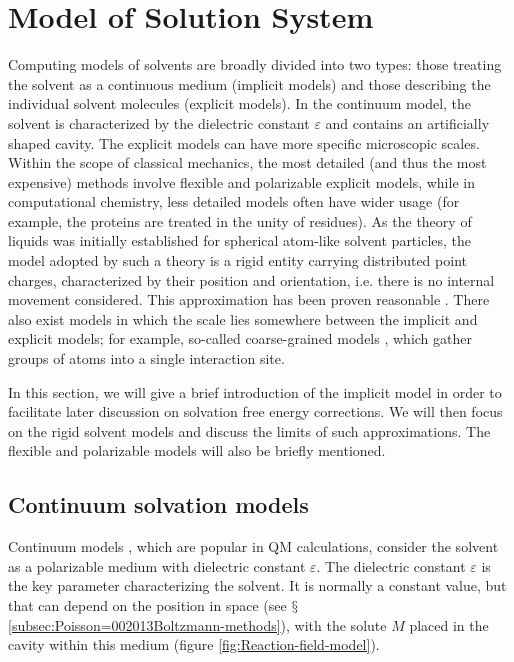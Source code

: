 
\chapter{Model of Solution System\label{chpt:models}}

Computing models of solvents are broadly divided into two types: those
treating the solvent as a continuous medium (implicit models) and
those describing the individual solvent molecules (explicit models).
In the continuum model, the solvent is characterized by the dielectric
constant $\varepsilon$ and contains an artificially shaped cavity.
The explicit models can have more specific microscopic scales. Within
the scope of classical mechanics, the most detailed (and thus the
most expensive) methods involve flexible and polarizable explicit
models, while in computational chemistry, less detailed models often
have wider usage (for example, the proteins are treated in the unity
of residues). As the theory of liquids was initially established for
spherical atom-like solvent particles, the model adopted by such a
theory is a rigid entity carrying distributed point charges, characterized
by their position and orientation, i.e. there is no internal movement
considered. This approximation has been proven reasonable \citep{Gray-Gubbins}.
There also exist models in which the scale lies somewhere between
the implicit and explicit models; for example, so-called coarse-grained
models \citep{hadley_coarse-grained_2012}, which gather groups of
atoms into a single interaction site.

In this section, we will give a brief introduction of the implicit
model in order to facilitate later discussion on solvation free energy
corrections. We will then focus on the rigid solvent models and discuss
the limits of such approximations. The flexible and polarizable models
will also be briefly mentioned. 

\section{Continuum solvation models}

Continuum models \citep{Jensen,Cramer_1999,Tomasi_1994_implicit_model},
which are popular in \acs{QM} calculations, consider the solvent
as a polarizable medium with dielectric constant $\varepsilon$\marginpar. The dielectric constant $\varepsilon$ is the key parameter characterizing
the solvent. It is normally a constant value, but that can depend
on the position in space (see $\mathsection$\ref{subsec:Poisson=002013Boltzmann-methods}), with the solute $M$ placed in the cavity within this medium (figure
\ref{fig:Reaction-field-model}). 

